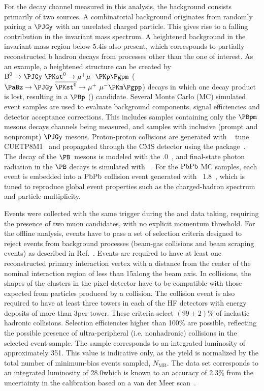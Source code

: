 For the decay channel measured in this analysis, the background consists primarily of two sources.
A combinatorial background originates from randomly pairing a $\PJGy$ with an unrelated charged particle. This gives rise to a falling contribution in the invariant mass spectrum.
A heightened background in the invariant mass region below 5.4\GeVcc is also present, which corresponds to partially reconstructed b hadron decays from processes other than the one of interest.
As an example, a heightened structure can be created by ${\text{B}}^{0} \to \PJGy~\PKst^0 \to \mu^{+}\mu^{-}\PKp\Pgpm$ ($\PaBz \to \PJGy~\overline{\PKst^0} \to \mu^{+}~\mu^{-}\PKm\Pgpp$) decays in which one decay product is lost, resulting in a $\PBp$ (\PBm) candidate.
Several Monte Carlo (MC) simulated event samples are used to evaluate background components, signal efficiencies and detector acceptance corrections. This includes samples containing only the $\PBpm$ mesons decays channels being measured, and samples with inclusive (prompt and nonprompt) $\PJGy$ mesons.
Proton-proton collisions are generated with ~\cite{Sjostrand:2014zea} tune CUETP8M1~\cite{Khachatryan:2015pea} and propagated through the CMS detector using the \GEANTfour package~\cite{geant4}.
The decay of the $\PB$~mesons is modeled with the .0~\cite{evtgen}, and final-state photon radiation in the $\PB$ decays is simulated with ~\cite{Barberio:1990ms}. For the $\mathrm{PbPb}$ MC samples, each  event is embedded into a $\mathrm{PbPb}$ collision event generated with {\HYDJET}~1.8~\cite{Lokhtin:2005px}, which is tuned to reproduce global event properties such as the charged-hadron \pt spectrum and particle multiplicity.

Events were collected with the same trigger during the \pp and \PbPb data taking, requiring the presence of two muon candidates, with no explicit momentum threshold. For the offline analysis, events have to pass a set of selection criteria designed to reject events from background processes
(beam-gas collisions and beam scraping events) as described in Ref.~\cite{Khachatryan:2016odn}. Events are required to have
at least one reconstructed primary interaction vertex with a distance from the center of the nominal interaction region of less than 15\cm along the beam axis. In \PbPb collisions, the
shapes of the clusters in the pixel detector have to be
compatible with those expected from particles produced by a \PbPb
collision. The \PbPb collision event is also required to have at least
three towers in each of the HF detectors with energy deposits of more
than 3\GeV per tower. These criteria select $(99\pm2)$\% of inelastic hadronic \PbPb collisions. Selection efficiencies higher
than 100\% are possible, reflecting the possible presence of ultra-peripheral (i.e. nonhadronic) collisions in the selected
event sample.
The \PbPb sample corresponds to an integrated luminosity of approximately 351\mubinv. This value is indicative only, as the \PbPb yield is normalized by the total number of minimum-bias events sampled, $N_{\text{MB}}$. The \pp data set corresponds to an integrated luminosity of 28.0\pbinv which is known to an accuracy of 2.3\% from the uncertainty in the calibration based on a van der Meer scan~\cite{CMS-PAS-LUM-16-001}.

